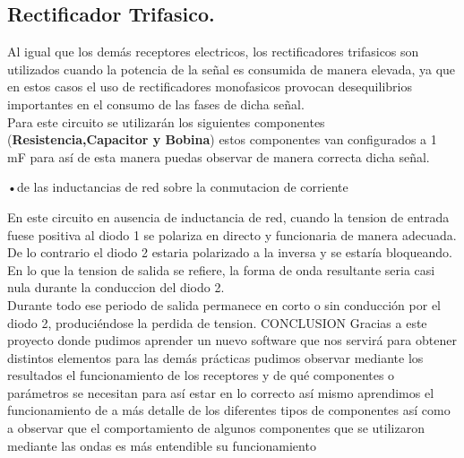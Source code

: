 \subsection{Rectificador Trifasico.}
Al igual que los demás receptores electricos, los rectificadores trifasicos  son utilizados cuando la potencia de la señal es consumida de manera elevada, ya que en estos casos el uso de rectificadores monofasicos provocan  desequilibrios importantes en el consumo de las fases de dicha señal.\\
Para este circuito se utilizarán los siguientes componentes  (\textbf{Resistencia,Capacitor y Bobina}) estos componentes van configurados a 1 mF para así de esta manera puedas observar de manera correcta dicha señal.
\caption{•de las inductancias de red sobre la conmutacion de corriente}
En este circuito en ausencia de inductancia de red, cuando la tension de entrada fuese positiva al diodo 1 se polariza en directo y funcionaria de manera adecuada. De lo contrario el diodo 2 estaria polarizado a la inversa y se estaría  bloqueando.\\
En lo que la tension de salida se refiere, la forma de onda resultante seria casi nula durante la conduccion del diodo 2.\\
Durante todo ese periodo de salida permanece en corto o sin conducción por el diodo 2, produciéndose la perdida de tension.
CONCLUSION
Gracias a este proyecto donde pudimos aprender un nuevo software que nos servirá para obtener distintos elementos para las demás prácticas pudimos observar mediante los resultados el funcionamiento de los receptores y de qué componentes o parámetros se necesitan para así estar en lo correcto así mismo aprendimos el funcionamiento de a más detalle de los diferentes tipos de componentes así como a observar que el comportamiento de algunos componentes que se utilizaron mediante las ondas es más entendible su funcionamiento